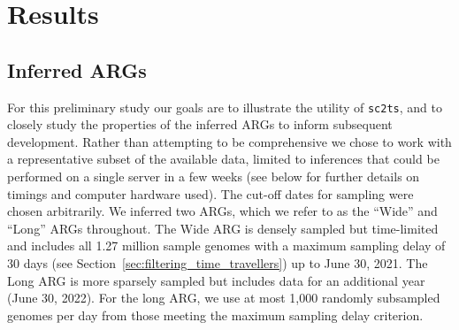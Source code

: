 \documentclass{article}
\begin{document}



\section{Results}
\subsection{Inferred ARGs}
For this preliminary study our goals are to illustrate the utility of
\texttt{sc2ts}, and to closely study the properties of the
inferred ARGs to inform subsequent development. Rather
than attempting to be comprehensive we chose to work with a
representative subset of the available data, limited to
inferences that could be performed on a single server in
a few weeks (see below for further details on timings and
computer hardware used). The cut-off dates for sampling were chosen
arbitrarily.
We inferred two ARGs, which we refer to as the
``Wide'' and ``Long'' ARGs throughout.
The Wide ARG is densely sampled but time-limited and
includes all 1.27 million sample genomes  with a
maximum sampling delay of 30 days
(see Section~\ref{sec:filtering_time_travellers})
up to June 30, 2021.
The Long ARG is more sparsely sampled but
includes data for an additional year (June 30, 2022).
For the long ARG, we use at most 1,000 randomly subsampled
genomes per day from those meeting the maximum sampling delay criterion.
\end{document}
